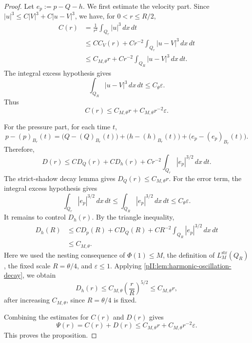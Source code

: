 \documentclass[11pt]{article}
\numberwithin{equation}{section}
\theoremstyle{plain}
\theoremstyle{definition}
\theoremstyle{remark}
\newcommand{\str}{\mathrm{str}}
\newcommand{\dxdt}{\,dx\,dt}
\begin{document}
\begin{proof}
Let $e_p:=p-Q-h$.  We first estimate the velocity part.  Since $|u|^3\le C|V|^3+C|u-V|^3$, we have, for $0<r\le R/2$,
\[
\begin{aligned}
        C(r)
        &=
        \frac1{r^2}\int_{Q_r}|u|^3\dxdt       \\
        &\le
        C C_V(r)
        +
        C r^{-2}\int_{Q_r}|u-V|^3\dxdt        \\
        &\le
        C_{M,\theta}r
        +
        C r^{-2}\int_{Q_R}|u-V|^3\,dx\,dt.
\end{aligned}
\]
The integral excess hypothesis gives
\[
        \int_{Q_R}|u-V|^3\,dx\,dt\le C_\theta\varepsilon .
\]
Thus
\[
        C(r)
        \le
        C_{M,\theta}r+C_{M,\theta}r^{-2}\varepsilon .
\]

For the pressure part, for each time $t$,
\[
        p-(p)_{B_r}(t)
        =
        \bigl(Q-(Q)_{B_r}(t)\bigr)
        +
        \bigl(h-(h)_{B_r}(t)\bigr)
        +
        \bigl(e_p-(e_p)_{B_r}(t)\bigr).
\]
Therefore,
\[
        D(r)
        \le
        C D_Q(r)
        +
        C D_h(r)
        +
        C r^{-2}\int_{Q_r}|e_p|^{3/2}\dxdt .
\]
The strict-shadow decay lemma gives $D_Q(r)\le C_{M,\theta}r$.  For the error term, the integral excess hypothesis gives
\[
        \int_{Q_r}|e_p|^{3/2}\dxdt
        \le
        \int_{Q_R}|e_p|^{3/2}\dxdt
        \le
        C_\theta\varepsilon .
\]
It remains to control $D_h(r)$.  By the triangle inequality,
\[
\begin{aligned}
        D_h(R)
        &\le
        C D_p(R)+C D_Q(R)
        +
        C R^{-2}\int_{Q_R}|e_p|^{3/2}\dxdt  \\
        &\le
        C_{M,\theta}.
\end{aligned}
\]
Here we used the nesting consequence of $\Phi(1)\le M$, the definition of $L_M^{\str}(Q_R)$, the fixed scale $R=\theta/4$, and $\varepsilon\le1$.  Applying \cref{pII:lem:harmonic-oscillation-decay}, we obtain
\[
        D_h(r)
        \le
        C_{M,\theta}\left(\frac{r}{R}\right)^{5/2}
        \le
        C_{M,\theta}r,
\]
after increasing $C_{M,\theta}$, since $R=\theta/4$ is fixed.

Combining the estimates for $C(r)$ and $D(r)$ gives
\[
        \Psi(r)=C(r)+D(r)
        \le
        C_{M,\theta}r
        +
        C_{M,\theta}r^{-2}\varepsilon .
\]
This proves the proposition.
\end{proof}
\end{document}
